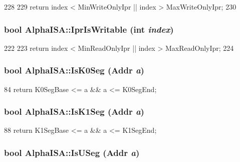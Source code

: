 \begin{DoxyCode}
228 {
229     return index < MinWriteOnlyIpr || index > MaxWriteOnlyIpr;
230 }
\end{DoxyCode}
\hypertarget{namespaceAlphaISA_aa3cf21b4a9cdea68799e13e18f44d3d4}{
\subsubsection[{IprIsWritable}]{\setlength{\rightskip}{0pt plus 5cm}bool AlphaISA::IprIsWritable (int {\em index})}}
\label{namespaceAlphaISA_aa3cf21b4a9cdea68799e13e18f44d3d4}



\begin{DoxyCode}
222 {
223     return index < MinReadOnlyIpr || index > MaxReadOnlyIpr;
224 }
\end{DoxyCode}
\hypertarget{namespaceAlphaISA_ae30e2a62fc7b8017254375687db343ee}{
\subsubsection[{IsK0Seg}]{\setlength{\rightskip}{0pt plus 5cm}bool AlphaISA::IsK0Seg ({\bf Addr} {\em a})}}
\label{namespaceAlphaISA_ae30e2a62fc7b8017254375687db343ee}



\begin{DoxyCode}
84 { return K0SegBase <= a && a <= K0SegEnd; }
\end{DoxyCode}
\hypertarget{namespaceAlphaISA_ab93fa394a0732944836267b5ca194e99}{
\subsubsection[{IsK1Seg}]{\setlength{\rightskip}{0pt plus 5cm}bool AlphaISA::IsK1Seg ({\bf Addr} {\em a})}}
\label{namespaceAlphaISA_ab93fa394a0732944836267b5ca194e99}



\begin{DoxyCode}
88 { return K1SegBase <= a && a <= K1SegEnd; }
\end{DoxyCode}
\hypertarget{namespaceAlphaISA_a2451f4cdda3759a112904a5bf9adc948}{
\subsubsection[{IsUSeg}]{\setlength{\rightskip}{0pt plus 5cm}bool AlphaISA::IsUSeg ({\bf Addr} {\em a})}}
\label{namespaceAlphaISA_a2451f4cdda3759a112904a5bf9adc948}



